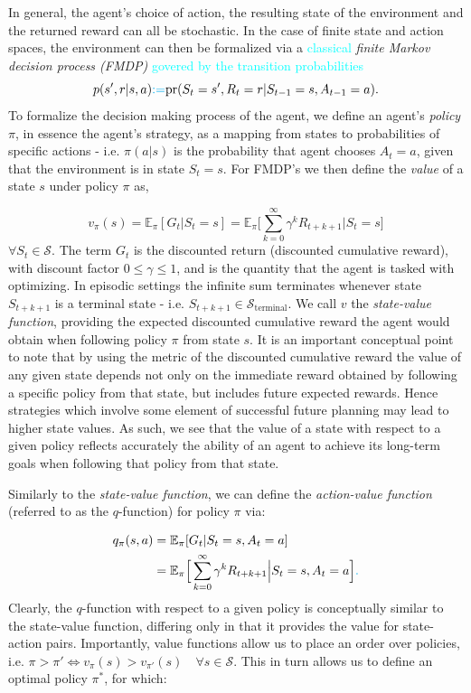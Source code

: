 \documentclass[twocolumn,preprintnumbers,amsmath,amssymb,notitlepage,nofootinbib,longbibliography,superscriptaddress,aps,pra,10pt]{revtex4-1}
\newcommand{\je}[1]{\textcolor{cyan}{#1}}
\begin{document}
	In general, the agent's choice of action, the resulting state of the environment and the returned reward can all be stochastic. In the case of finite state and action spaces, the environment can then be formalized via a  \je{classical}  \emph{finite Markov decision process (FMDP)} \je{govered by the transition probabilities}
	\begin{equation}
		p(s',r|s,a)\je{ := }\mathrm{pr}(S_t = s',R_t = r|S_{t-1} = s, A_{t-1} = a).
	\end{equation}
	To formalize the decision making process of the agent, we define an agent's \textit{policy} $\pi$, in essence the agent's strategy, as a mapping from states to probabilities of specific actions - i.e. $\pi(a|s)$ is the probability that agent chooses $A_t = a$, given that the environment is in state $S_t = s$.
	For FMDP's we then define the \textit{value} of a state $s$ under policy $\pi$ as,

	\begin{equation}
		v_{\pi}(s) = \mathbb{E}_{\pi}[G_t|S_t = s]  = \mathbb{E}_{\pi} \Big[\sum_{k = 0}^{\infty}\gamma^k R_{t+k+1}\Big| S_t = s \Big] 
	\end{equation}
	$\forall S_t \in \mathcal{S}$. 
	The term $G_t$ is the discounted return (discounted cumulative reward), with discount factor $0 \leq \gamma \leq 1$, and is the quantity that the agent is tasked with optimizing.
	In episodic settings the infinite sum terminates whenever state $S_{t+k+1}$ is a terminal state - i.e. $S_{t+k+1} \in \mathcal{S}_{\mathrm{terminal}}$.
	We call $v$ the \textit{state-value function}, providing the expected discounted cumulative reward the agent would obtain when following policy $\pi$ from state $s$.
	It is an important conceptual point to note that by using the metric of the discounted cumulative reward the value of any given state depends not only on the immediate reward obtained by following a specific policy from that state, but includes future expected rewards.
	Hence strategies which involve some element of successful future planning may lead to higher state values.
	As such, we see that the value of a state with respect to a given policy reflects accurately the ability of an agent to achieve its long-term goals when following that policy from that state. 

	Similarly to the \textit{state-value function}, we can define the \textit{action-value function}  (referred to as the $q$-function) for policy $\pi$ via:

	\begin{align}
		q_{\pi}(s,a) &= \mathbb{E}_{\pi}[G_t|S_t = s, A_t = a]  \\
		& = \mathbb{E}_{\pi} \Big[\sum_{k = 0}^{\infty}\gamma^k R_{t+k+1}\Big| S_t = s, A_t = a \Big] \je{.}
	\end{align}
	Clearly, the $q$-function with respect to a given policy is conceptually similar to the state-value function, differing only in that it provides the value for state-action pairs.
	Importantly, value functions allow us to place an order over policies, i.e. $\pi > \pi' \iff v_{\pi}(s) > v_{\pi'}(s)\quad \forall s \in \mathcal{S} $.
	This in turn allows us to define an optimal policy $\pi^*$, for which:
\end{document}
